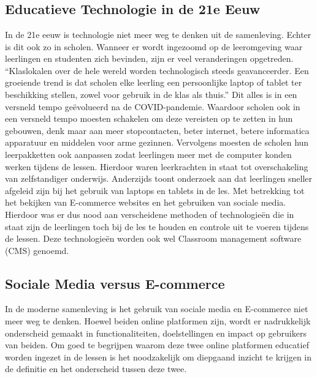 \chapter{}%
\label{ch:stand-van-zaken}


\section{Educatieve Technologie in de 21e Eeuw}
In de 21e eeuw is technologie niet meer weg te denken uit de samenleving. Echter is dit ook zo in scholen. Wanneer er wordt ingezoomd op de leeromgeving waar leerlingen en studenten zich bevinden, zijn er veel veranderingen opgetreden. ``Klaslokalen over de hele wereld worden technologisch steeds geavanceerder. Een groeiende trend is dat scholen elke leerling een persoonlijke laptop of tablet ter beschikking stellen, zowel voor gebruik in de klas als thuis.'' \textcite{HALL2021101957} Dit alles is in een versneld tempo geëvolueerd na de COVID-pandemie. Waardoor scholen ook in een versneld tempo moesten schakelen om deze vereisten op te zetten in hun gebouwen, denk maar aan meer stopcontacten, beter internet, betere informatica apparatuur en middelen voor arme gezinnen.\newline
Vervolgens moesten de scholen hun leerpakketten ook aanpassen zodat leerlingen meer met de computer konden werken tijdens de lessen. Hierdoor waren leerkrachten in staat tot overschakeling van zelfstandiger onderwijs. Anderzijds toont onderzoek aan dat leerlingen sneller afgeleid zijn bij het gebruik van laptops en tablets in de les. \textcite{deng2020laptops} Met betrekking tot het bekijken van E-commerce websites en het gebruiken van sociale media. Hierdoor was er dus nood aan verscheidene methoden of technologieën die in staat zijn de leerlingen toch bij de les te houden en controle uit te voeren tijdens de lessen. Deze technologieën worden ook wel Classroom management software (CMS) genoemd.

\section{Sociale Media versus E-commerce}
In de moderne samenleving is het gebruik van sociale media en E-commerce niet meer weg te denken. Hoewel beiden online platformen zijn, wordt er nadrukkelijk onderscheid gemaakt in functionaliteiten, doelstellingen en impact op gebruikers van beiden. Om goed te begrijpen waarom deze twee online platformen educatief worden ingezet in de lessen is het noodzakelijk om diepgaand inzicht te krijgen in de definitie en het onderscheid tussen deze twee. \newline
